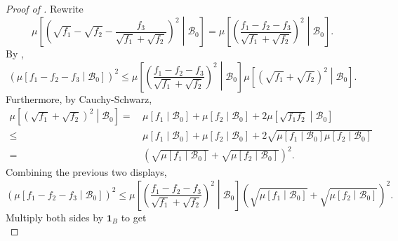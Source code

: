 \begin{proof}[Proof of ]
Rewrite
\begin{equation*}
    \mu \left[ \left( \sqrt{f_{1}} - \sqrt{f_{2}} - \frac{f_{3}}{\sqrt{f_{1}} +
    \sqrt{f_{2}}} \right)^{2} \middle| \mathcal{B}_{0} \right] = \mu \left[
    \left( \frac{f_{1} - f_{2} - f_{3}}{\sqrt{f_{1}} + \sqrt{f_{2}}} \right)^{2}
    \middle| \mathcal{B}_{0} \right].
\end{equation*}
By ,
\begin{equation*}
  \left( \mu \left[ f_{1} - f_{2} - f_{3} \middle| \mathcal{B}_{0} \right]
  \right)^{2} \leq
  \mu \left[ \left( \frac{f_{1} - f_{2} - f_{3}}{\sqrt{f_{1}} + \sqrt{f_{2}}}
  \right)^{2} \middle| \mathcal{B}_{0} \right] \mu \left[ \left( \sqrt{f_{1}} +
  \sqrt{f_{2}} \right)^{2} \middle| \mathcal{B}_{0} \right].
\end{equation*}
Furthermore, by Cauchy-Schwarz,
\begin{equation*}
  \begin{split}
    \mu \left[ \left( \sqrt{f_{1}} + \sqrt{f_{2}} \right)^{2} \middle|
    \mathcal{B}_{0} \right] =
    & \, \mu \left[ f_{1} \middle| \mathcal{B}_{0} \right] + \mu \left[ f_{2}
    \middle| \mathcal{B}_{0} \right] + 2 \mu \left[ \sqrt{f_{1}
    f_{2}} \middle| \mathcal{B}_{0} \right] \\
    \leq
    & \, \mu \left[ f_{1} \middle| \mathcal{B}_{0} \right] + \mu \left[ f_{2}
    \middle| \mathcal{B}_{0} \right] + 2 \sqrt{\mu \left[ f_{1} \middle|
    \mathcal{B}_{0} \right] \mu \left[ f_{2} \middle| \mathcal{B}_{0} \right]}
    \\
    =
    & \, \left( \sqrt{\mu \left[ f_{1} \middle| \mathcal{B}_{0} \right]} +
    \sqrt{\mu \left[ f_{2} \middle| \mathcal{B}_{0} \right]} \right)^{2}.
  \end{split}
\end{equation*}
Combining the previous two displays,
\begin{equation*}
  \left( \mu \left[ f_{1} - f_{2} - f_{3} \middle| \mathcal{B}_{0} \right]
  \right)^{2} \leq
  \mu \left[ \left( \frac{f_{1} - f_{2} - f_{3}}{\sqrt{f_{1}} +
  \sqrt{f_{2}}} \right)^{2} \middle| \mathcal{B}_{0} \right]
  \left( \sqrt{\mu \left[ f_{1} \middle| \mathcal{B}_{0} \right]} + \sqrt{\mu
  \left[ f_{2} \middle| \mathcal{B}_{0} \right]} \right)^{2}.
\end{equation*}
Multiply both sides by \(\mathbf{1}_{B}\) to get
\begin{equation*}

\end{equation*}
\end{proof}
